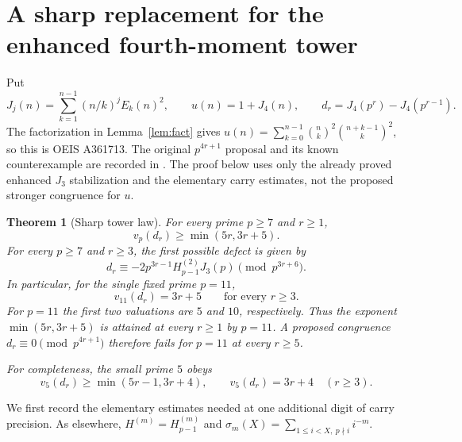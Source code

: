 \documentclass[11pt]{amsart}
\newtheorem{theorem}{Theorem}[section]
\theoremstyle{definition}
\theoremstyle{remark}
\begin{document}
\section{A sharp replacement for the enhanced fourth-moment tower}

Put
\[
J_j(n)=\sum_{k=1}^{n-1}(n/k)^jE_k(n)^2,
\qquad u(n)=1+J_4(n),
\qquad d_r=J_4(p^r)-J_4(p^{r-1}).
\]
The factorization in Lemma~\ref{lem:fact} gives
$u(n)=\sum_{k=0}^{n-1}\binom nk^2\binom{n+k-1}k^2$, so this is
OEIS A361713. The original $p^{4r+1}$ proposal and its known counterexample
are recorded in \cite{A361713,Adam}. The proof below uses only the already proved enhanced
$J_3$ stabilization and the elementary carry estimates, not the proposed
stronger congruence for $u$.

\begin{theorem}[Sharp tower law]\label{thm:sharp-J4}
For every prime $p\ge7$ and $r\ge1$,
\[
v_p(d_r)\ge\min(5r,3r+5).
\]
For every $p\ge7$ and $r\ge3$, the first possible defect is given by
\begin{equation}\label{eq:sharp-J4}
d_r\equiv-2p^{3r-1}H_{p-1}^{(2)}J_3(p)
 \pmod{p^{3r+6}}.
\end{equation}
In particular, for the single fixed prime $p=11$,
\[
v_{11}(d_r)=3r+5\qquad\text{for every }r\ge3.
\]
For $p=11$ the first two valuations are $5$ and $10$, respectively.
Thus the exponent $\min(5r,3r+5)$ is attained at every $r\ge1$ by
$p=11$. A proposed congruence $d_r\equiv0\pmod{p^{4r+1}}$ therefore
fails for $p=11$ at \emph{every} $r\ge5$.

For completeness, the small prime $5$ obeys
\[
v_5(d_r)\ge\min(5r-1,3r+4),\qquad
v_5(d_r)=3r+4\quad(r\ge3).
\]
\end{theorem}

We first record the elementary estimates needed at one additional digit
of carry precision. As elsewhere, $H^{(m)}=H_{p-1}^{(m)}$ and
$\sigma_m(X)=\sum_{1\le i<X,\ p\nmid i}i^{-m}$.
\end{document}
